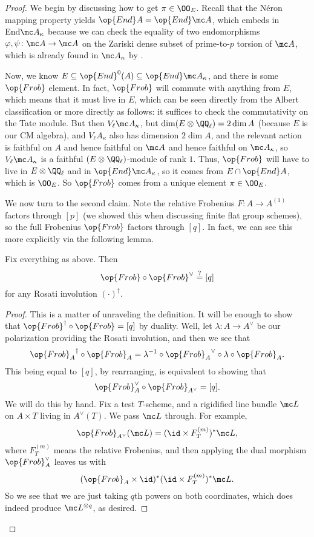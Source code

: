 \documentclass[../notes.tex]{subfiles}
\begin{document}
\begin{proof}
	We begin by discussing how to get $\pi\in\OO_E$. Recall that the N\'eron mapping property yields $\op{End}A=\op{End}\mc A$, which embeds in $\mathrm{End}\mc A_\kappa$ because we can check the equality of two endomorphisms $\varphi,\psi\colon\mc A\to\mc A$ on the Zariski dense subset of prime-to-$p$ torsion of $\mc A$, which is already found in $\mc A_\kappa$ by .

	Now, we know $E\subseteq\op{End}^0(A)\subseteq\op{End}\mc A_\kappa$, and there is some $\op{Frob}$ element. In fact, $\op{Frob}$ will commute with anything from $E$, which means that it must live in $E$, which can be seen directly from the Albert classification or more directly as follows: it suffices to check the commutativity on the Tate module. But then $V_\ell\mc A_\kappa$, but $\dim(E\otimes\QQ_\ell)=2\dim A$ (because $E$ is our CM algebra), and $V_\ell A_\kappa$ also has dimension $2\dim A$, and the relevant action is faithful on $A$ and hence faithful on $\mc A$ and hence faithful on $\mc A_\kappa$, so $V_\ell\mc A_\kappa$ is a faithful $(E\otimes\QQ_\ell)$-module of rank $1$. Thus, $\op{Frob}$ will have to live in $E\otimes\QQ_\ell$ and in $\op{End}\mc A_\kappa$, so it comes from $E\cap\op{End}A$, which is $\OO_E$. So $\op{Frob}$ comes from a unique element $\pi\in\OO_E$.

	We now turn to the second claim. Note the relative Frobenius $F\colon A\to A^{(1)}$ factors through $[p]$ (we showed this when discussing finite flat group schemes), so the full Frobenius $\op{Frob}$ factors through $[q]$. In fact, we can see this more explicitly via the following lemma.
	\begin{lemma} \label{lem:frob-through-q}
		Fix everything as above. Then
		\[{\op{Frob}}\circ{\op{Frob}}^\lor\stackrel?=[q]\]
		for any Rosati involution $(\cdot)^\dagger$.
	\end{lemma}
	\begin{proof}
		This is a matter of unraveling the definition. It will be enough to show that ${\op{Frob}}^\dagger\circ{\op{Frob}}=[q]$ by duality. Well, let $\lambda\colon A\to A^\lor$ be our polarization providing the Rosati involution, and then we see that
		\[{\op{Frob}_A}^\dagger\circ{\op{Frob}_A}=\lambda^{-1}\circ{\op{Frob}_A}^\lor\circ\lambda\circ\op{Frob}_A.\]
		This being equal to $[q]$, by rearranging, is equivalent to showing that
		\[{\op{Frob}_A^\lor}\circ{\op{Frob}_{A^\lor}}=[q].\]
		We will do this by hand. Fix a test $T$-scheme, and a rigidified line bundle $\mc L$ on $A\times T$ living in $A^\lor(T)$. We pass $\mc L$ through. For example,
		\[\op{Frob}_{A^\lor}(\mc L)=({\id}\times F_T^{(m)})^*\mc L,\]
		where $F_T^{(m)}$ means the relative Frobenius, and then applying the dual morphism $\op{Frob}_A^\lor$ leaves us with
		\[({\op{Frob}_A}\times{\id})^*({\id}\times F_T^{(m)})^*\mc L.\]
		So we see that we are just taking $q$th powers on both coordinates, which does indeed produce $\mc L^{\otimes q}$, as desired.
	\end{proof}


\end{proof}
\end{document}
